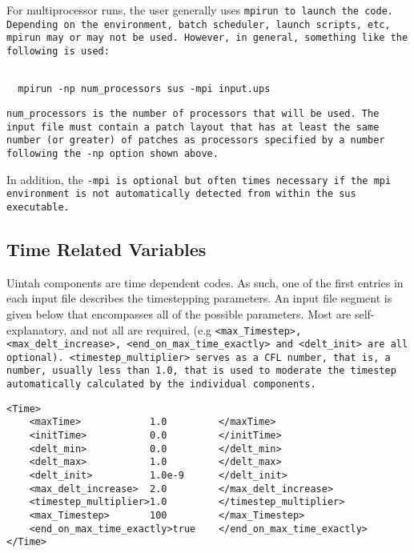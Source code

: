 For multiprocessor runs, the user generally uses \tt mpirun \normalfont to launch
the code.  Depending on the environment, batch scheduler, launch
scripts, etc, \tt mpirun \normalfont may or may not be used.  However, in general,
something like the following is used:
\begin{Verbatim}[fontsize=\footnotesize]

  mpirun -np num_processors sus -mpi input.ups

\end{Verbatim}
\tt num\_processors \normalfont is the number of processors that will be used.  The
input file must contain a patch layout that has at least the same
number (or greater) of patches as processors specified by a number
following the -np option shown above.

In addition, the \tt -mpi \normalfont is optional but often times necessary if the mpi
environment is not automatically detected from within the sus
executable.
 
\subsection{Time Related Variables} \label{Sec:TimeRelatedVariables}
Uintah components are time dependent codes.  As such, one of the first entries
in each input file describes the timestepping parameters.  An input file
segment is given below that encompasses all of the possible parameters.
Most are self-explanatory, and not all are required,
(e.g \tt <max\_Timestep>,
<max\_delt\_increase>, <end\_on\_max\_time\_exactly> \normalfont and
\tt <delt\_init> \normalfont are all optional).
\tt <timestep\_multiplier> \normalfont serves
as a CFL number, that is, a number, usually less than 1.0, that is used to
moderate the timestep automatically calculated by the individual components. 

\begin{Verbatim}[fontsize=\footnotesize]
<Time>
    <maxTime>            1.0         </maxTime>
    <initTime>           0.0         </initTime>
    <delt_min>           0.0         </delt_min>
    <delt_max>           1.0         </delt_max>
    <delt_init>          1.0e-9      </delt_init>
    <max_delt_increase>  2.0         </max_delt_increase>
    <timestep_multiplier>1.0         </timestep_multiplier>
    <max_Timestep>       100         </max_Timestep>
    <end_on_max_time_exactly>true    </end_on_max_time_exactly>
</Time>
\end{Verbatim}
%

